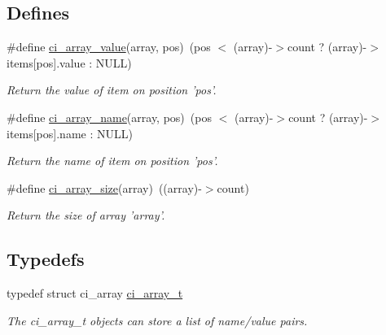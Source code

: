 \subsection*{Defines}
\begin{DoxyCompactItemize}
\item 
\hypertarget{group__SIMPLE__ARRAYS_ga45db1c52c0403d416cb8546e3bc36c4f}{
\#define \hyperlink{group__SIMPLE__ARRAYS_ga45db1c52c0403d416cb8546e3bc36c4f}{ci\_\-array\_\-value}(array, pos)~(pos $<$ (array)-\/$>$count ?  (array)-\/$>$items\mbox{[}pos\mbox{]}.value : NULL)}
\label{group__SIMPLE__ARRAYS_ga45db1c52c0403d416cb8546e3bc36c4f}

\begin{DoxyCompactList}\small\item\em Return the value of item on position 'pos'. \item\end{DoxyCompactList}\item 
\hypertarget{group__SIMPLE__ARRAYS_ga63e9668bc717322275f3cf840331a77e}{
\#define \hyperlink{group__SIMPLE__ARRAYS_ga63e9668bc717322275f3cf840331a77e}{ci\_\-array\_\-name}(array, pos)~(pos $<$ (array)-\/$>$count ?  (array)-\/$>$items\mbox{[}pos\mbox{]}.name : NULL)}
\label{group__SIMPLE__ARRAYS_ga63e9668bc717322275f3cf840331a77e}

\begin{DoxyCompactList}\small\item\em Return the name of item on position 'pos'. \item\end{DoxyCompactList}\item 
\hypertarget{group__SIMPLE__ARRAYS_ga2b1e5dc04531d3ead16ac0b01f21bba2}{
\#define \hyperlink{group__SIMPLE__ARRAYS_ga2b1e5dc04531d3ead16ac0b01f21bba2}{ci\_\-array\_\-size}(array)~((array)-\/$>$count)}
\label{group__SIMPLE__ARRAYS_ga2b1e5dc04531d3ead16ac0b01f21bba2}

\begin{DoxyCompactList}\small\item\em Return the size of array 'array'. \item\end{DoxyCompactList}\end{DoxyCompactItemize}
\subsection*{Typedefs}
\begin{DoxyCompactItemize}
\item 
typedef struct ci\_\-array \hyperlink{group__SIMPLE__ARRAYS_ga1bec5de79ca98bb53c039a8f8e959137}{ci\_\-array\_\-t}
\begin{DoxyCompactList}\small\item\em The ci\_\-array\_\-t objects can store a list of name/value pairs. \item\end{DoxyCompactList}\end{DoxyCompactItemize}
